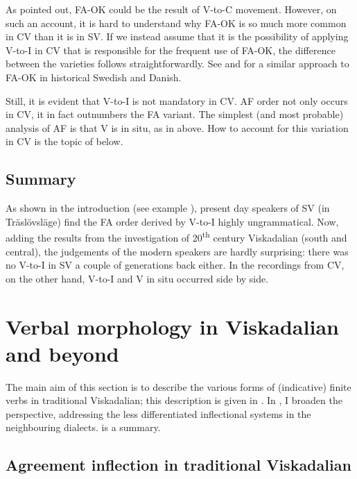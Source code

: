\documentclass[output=paper,colorlinks,citecolor=brown,draft,draftmode]{langscibook}
\begin{document}
As pointed out, FA-OK could be the result of V-to-C movement. However, on such an account, it is hard to understand why FA-OK is so much more common in CV than it is in SV. If we instead assume that it is the possibility of applying V-to-I in CV that is responsible for the frequent use of FA-OK, the difference between the varieties follows straightforwardly. See \citet{Falk1993} and \citet{Sundquist2003} for a similar approach to FA-OK in historical Swedish and Danish. 



Still, it is evident that V-to-I is not mandatory in CV. AF order not only occurs in CV, it in fact outnumbers the FA variant. The simplest (and most probable) analysis of AF is that V is in situ, as in  above. How to account for this variation in CV is the topic of  below.


\subsection{Summary}\label{sec:petzell:2.5}


As shown in the introduction (see example ), present day speakers of SV (in Träslövsläge) find the FA order derived by V-to-I highly ungrammatical. Now, adding the results from the investigation of 20\textsuperscript{th} century Viskadalian (south and central), the judgements of the modern speakers are hardly surprising: there was no V-to-I in SV a couple of generations back either.{} In the recordings from CV, on the other hand, V-to-I and V in situ occurred side by side.


\section{Verbal morphology in Viskadalian and beyond}\label{sec:petzell:3}


The main aim of this section is to describe the various forms of (indicative) finite verbs in traditional Viskadalian; this description is given in . In , I broaden the perspective, addressing the less differentiated inflectional systems in the neighbouring dialects.  is a summary.


\subsection{Agreement inflection in traditional Viskadalian}\label{sec:petzell:3.1}
\end{document}
